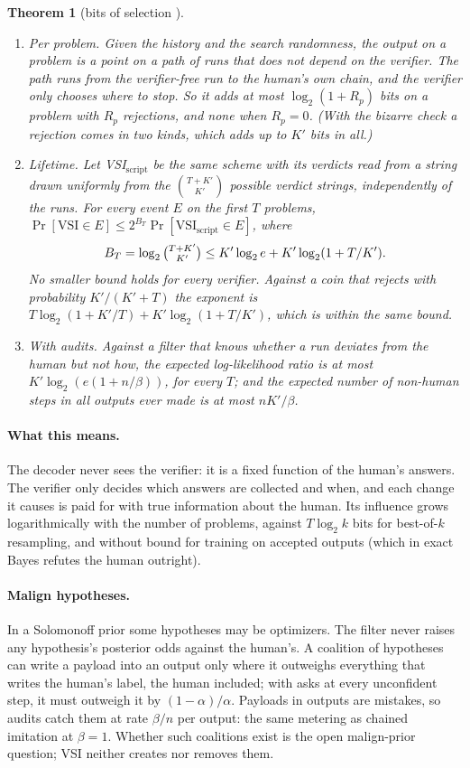 \documentclass[11pt]{article}
\newtheorem{theorem}{Theorem}[section]
\theoremstyle{definition}
\theoremstyle{remark}
\newcommand{\K}{K}
\begin{document}
\begin{theorem}[bits of selection \cite{threadV}]\label{thm:selection}\
\begin{enumerate}[label=(\alph*),nosep]
\item \emph{Per problem.} Given the history and the search randomness, the output on a problem is a point on a path of runs that does not depend on the verifier. The path runs from the verifier-free run to the human's own chain, and the verifier only chooses where to stop. So it adds at most $\log_2(1+R_p)$ bits on a problem with $R_p$ rejections, and none when $R_p=0$. (With the bizarre check a rejection comes in two kinds, which adds up to $\K'$ bits in all.)
\item \emph{Lifetime.} Let VSI$_{\mathrm{script}}$ be the same scheme with its verdicts read from a string drawn uniformly from the $\binom{T+\K'}{\K'}$ possible verdict strings, independently of the runs. For every event $E$ on the first $T$ problems, $\Pr[\text{VSI}\in E]\le 2^{B_T}\Pr[\text{VSI}_{\mathrm{script}}\in E]$, where
\[ B_T=\log_2\tbinom{T+\K'}{\K'}\le \K'\log_2 e+\K'\log_2(1+T/\K'). \]
No smaller bound holds for every verifier. Against a coin that rejects with probability $\K'/(\K'+T)$ the exponent is $T\log_2(1+\K'/T)+\K'\log_2(1+T/\K')$, which is within the same bound.
\item \emph{With audits.} Against a filter that knows whether a run deviates from the human but not how, the expected log-likelihood ratio is at most $\K'\log_2(e(1+n/\beta))$, for every $T$; and the expected number of non-human steps in all outputs ever made is at most $n\K'/\beta$.
\end{enumerate}
\end{theorem}

\paragraph{What this means.} The decoder never sees the verifier: it is a fixed function of the human's answers. The verifier only decides which answers are collected and when, and each change it causes is paid for with true information about the human. Its influence grows logarithmically with the number of problems, against $T\log_2k$ bits for best-of-$k$ resampling, and without bound for training on accepted outputs (which in exact Bayes refutes the human outright).

\paragraph{Malign hypotheses.} In a Solomonoff prior some hypotheses may be optimizers. The filter never raises any hypothesis's posterior odds against the human's. A coalition of hypotheses can write a payload into an output only where it outweighs everything that writes the human's label, the human included; with asks at every unconfident step, it must outweigh it by $(1-\alpha)/\alpha$. Payloads in outputs are mistakes, so audits catch them at rate $\beta/n$ per output: the same metering as chained imitation at $\beta=1$. Whether such coalitions exist is the open malign-prior question; VSI neither creates nor removes them.
\end{document}
